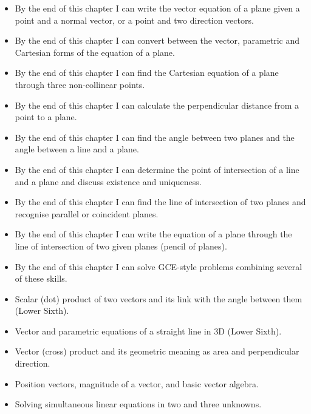 \documentclass[11pt]{article}
\begin{document}
\begin{objectifs}
\begin{itemize}
\item By the end of this chapter I can write the vector equation of a plane given a point and a normal vector, or a point and two direction vectors.
\item By the end of this chapter I can convert between the vector, parametric and Cartesian forms of the equation of a plane.
\item By the end of this chapter I can find the Cartesian equation of a plane through three non-collinear points.
\item By the end of this chapter I can calculate the perpendicular distance from a point to a plane.
\item By the end of this chapter I can find the angle between two planes and the angle between a line and a plane.
\item By the end of this chapter I can determine the point of intersection of a line and a plane and discuss existence and uniqueness.
\item By the end of this chapter I can find the line of intersection of two planes and recognise parallel or coincident planes.
\item By the end of this chapter I can write the equation of a plane through the line of intersection of two given planes (pencil of planes).
\item By the end of this chapter I can solve GCE-style problems combining several of these skills.
\end{itemize}
\end{objectifs}

\begin{prerequis}
\begin{itemize}
\item Scalar (dot) product of two vectors and its link with the angle between them (Lower Sixth).
\item Vector and parametric equations of a straight line in 3D (Lower Sixth).
\item Vector (cross) product and its geometric meaning as area and perpendicular direction.
\item Position vectors, magnitude of a vector, and basic vector algebra.
\item Solving simultaneous linear equations in two and three unknowns.
\end{itemize}
\end{prerequis}
\end{document}
